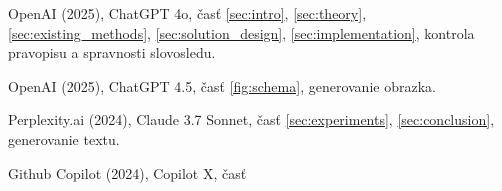 \begin{trivlist}
\item OpenAI (2025), ChatGPT 4o, časť \ref{sec:intro}, \ref{sec:theory}, \ref{sec:existing_methods}, \ref{sec:solution_design}, \ref{sec:implementation}, kontrola pravopisu a spravnosti slovosledu.

\item OpenAI (2025), ChatGPT 4.5, časť \ref{fig:schema}, generovanie obrazka.
\item Perplexity.ai (2024), Claude 3.7 Sonnet, časť \ref{sec:experiments}, \ref{sec:conclusion}, generovanie textu.

\item Github Copilot (2024), Copilot X, časť %

\end{trivlist}
